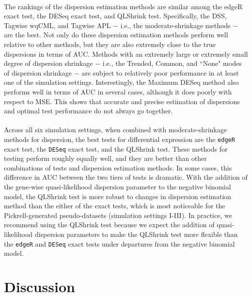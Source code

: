 \documentclass[10pt]{article}
\begin{document}
\paragraph{} \indent The rankings of the dispersion estimation methods are similar among the edgeR exact test, the DESeq exact test, and QLShrink test. Specifically, the DSS, Tagwise wqCML, and Tagwise APL $-$ i.e., the moderate-shrinkage methods $-$ are the best. Not only do these dispersion estimation methods perform well relative to other methods, but they are also extremely close to the true dispersions in terms of AUC. Methods with an extremely large or extremely small degree of dispersion shrinkage $-$ i.e., the Trended, Common, and ``None" modes of dispersion shrinkage $-$ are subject to relatively poor performance in at least one of the simulation settings. Interestingly, the Maximum DESeq method also performs well in terms of AUC in several cases, although it does poorly with respect to MSE. This shows that accurate and precise estimation of dispersions and optimal test performance do not always go together.


\paragraph{} \indent Across all six simulation settings, when combined with moderate-shrinkage methods for dispersion, the best tests for differential expression are the {\tt edgeR} exact test, the {\tt DESeq} exact test, and the QLShrink test. These methods for testing perform roughly equally well, and they are better than other combinations of tests and dispersion estimation methods. In some cases, this difference in AUC between the two tiers of tests is dramatic. With the addition of the gene-wise quasi-likelihood dispersion parameter to the negative binomial model, the QLShrink test is more robust to changes in dispersion estimation method than the either of the exact tests, which is most noticeable for the Pickrell-generated pseudo-datasets (simulation settings I-III). In practice, we recommend using the QLShrink test because we expect the addition of quasi-likelihood dispersion parameters to make the QLShrink test more flexible than the {\tt edgeR} and {\tt DESeq} exact tests under departures from the negative binomial model.

\section*{Discussion}
\end{document}
